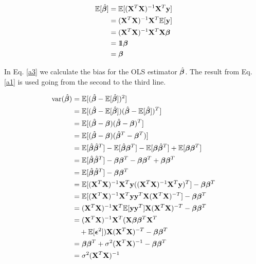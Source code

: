 \begin{align}\label{a3}
    \fv{\hat{\bet}} & = \fv{(\mathbf{X}^T\mathbf{X})^{-1}\mathbf{X}^T \y} \nonumber \\ 
    & = (\mathbf{X}^T\mathbf{X})^{-1}\mathbf{X}^T \fv{\y} \nonumber \\ 
    & = (\mathbf{X}^T\mathbf{X})^{-1}\mathbf{X}^T \mathbf{X}\bet \nonumber \\
    & = \unit \bet \nonumber \\
    & = \bet 
\end{align}

In Eq. \ref{a3} we calculate the bias for the OLS estimator $\hat{\bet}$. The result from Eq. \ref{a1} is used going from the second to the third line.

\begin{align}\label{a4}
    \text{var}(\hat{\bet}) & = \fv{(\hat{\bet}-\fv{\hat{\bet}})^2} \nonumber \\
    & = \fv{(\hat{\bet}-\fv{\hat{\bet}})(\hat{\bet}-\fv{\hat{\bet}})^T} \nonumber \\ 
    & = \fv{(\hat{\bet}-\bet)(\hat{\bet}-\bet)^T} \nonumber \\ 
    & = \fv{(\hat{\bet}-\bet)(\hat{\bet}^T-\bet^T)} \nonumber \\
    & = \fv{\hat{\bet}\hat{\bet}^T} - \fv{\hat{\bet}\bet^T} - \fv{\bet \hat{\bet}^T} + \fv{\bet \bet^T} \nonumber \\
    & = \fv{\hat{\bet}\hat{\bet}^T} - \bet\bet^T - \bet\bet^T + \bet\bet^T \nonumber \\
    & = \fv{\hat{\bet}\hat{\bet}^T} - \bet\bet^T \nonumber \\
    & = \fv{\betta(\betta)^T} - \bet\bet^T \nonumber \\
    & = \fv{\betta \y^T \mathbf{X}(\mathbf{X}^T\mathbf{X})^{-T}} - \bet\bet^T \nonumber \\
    & = (\mathbf{X}^T\mathbf{X})^{-1}\mathbf{X}^T\fv{\y\y^T}\mathbf{X}(\mathbf{X}^T\mathbf{X})^{-T} - \bet\bet^T \nonumber \\
    & = (\mathbf{X}^T\mathbf{X})^{-1}\mathbf{X}^T(\mathbf{X}\bet \bet^T \mathbf{X}^T \\ 
    & \quad + \fv{\boldsymbol{\epsilon}^2})\mathbf{X}(\mathbf{X}^T\mathbf{X})^{-T} - \bet\bet^T \nonumber \\
    & = \bet \bet^T + \sigma^2 (\mathbf{X}^T\mathbf{X})^{-1} - \bet \bet^T \nonumber \\
    & = \sigma^2 (\mathbf{X}^T\mathbf{X})^{-1}
\end{align}

